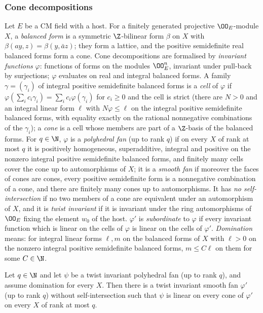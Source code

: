 \subsubsection*{Cone decompositions}
Let $E$ be a CM field with a host. For a finitely generated projective $\OO_E$-module $X$, a
\emph{balanced form} is a symmetric $\Z$-bilinear form $\beta$ on $X$ with $\beta(ay,z)=\beta(y,\bar az)$;
they form a lattice, and the positive semidefinite real balanced forms form a cone. Cone decompositions
are formalised by \emph{invariant functions} $\varphi$: functions of forms on the modules $\OO_E^n$,
invariant under pull-back by surjections; $\varphi$ evaluates on real and integral balanced forms. A family
$\gamma=(\gamma_i)$ of integral positive semidefinite balanced forms is a \emph{cell} of $\varphi$ if
$\varphi(\sum_ic_i\gamma_i)=\sum_ic_i\varphi(\gamma_i)$ for $c_i\ge0$ and the cell is strict (there are $N>0$ and
an integral linear form $\ell$ with $N\varphi\le\ell$ on the integral positive semidefinite balanced forms,
with equality exactly on the rational nonnegative combinations of the $\gamma_i$); a \emph{cone} is a cell
whose members are part of a $\Z$-basis of the balanced forms. For $q\in\N$, $\varphi$ is a \emph{polyhedral
fan} (up to rank $q$) if on every $X$ of rank at most $q$ it is positively homogeneous, superadditive,
integral and positive on the nonzero integral positive semidefinite balanced forms, and finitely many
cells cover the cone up to automorphisms of $X$; it is a \emph{smooth fan} if moreover the faces of cones
are cones, every positive semidefinite form is a nonnegative combination of a cone, and there are
finitely many cones up to automorphisms. It has \emph{no self-intersection} if no two members of a cone are
equivalent under an automorphism of $X$, and it is \emph{twist invariant} if it is invariant under the ring
automorphisms of $\OO_E$ fixing the element $w_0$ of the host. $\varphi'$ is \emph{subordinate} to $\varphi$ if
every invariant function which is linear on the cells of $\varphi$ is linear on the cells of $\varphi'$.
\emph{Domination} means: for integral linear forms $\ell,m$ on the balanced forms of $X$ with $\ell>0$ on the
nonzero integral positive semidefinite balanced forms, $m\le C\ell$ on them for some $C\in\N$.

\begin{theorem}\label{pf:lift1:smoothfan}
Let $q\in\N$ and let $\psi$ be a twist invariant polyhedral fan (up to rank $q$), and assume domination
for every $X$. Then there is a twist invariant smooth fan $\varphi'$ (up to rank $q$) without
self-intersection such that $\psi$ is linear on every cone of $\varphi'$ on every $X$ of rank at most $q$.
\end{theorem}

